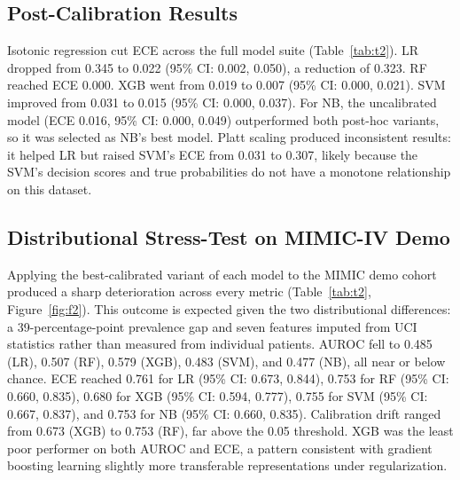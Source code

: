 \subsection{Post-Calibration Results}

Isotonic regression cut ECE across the full model suite (Table~\ref{tab:t2}). LR dropped from 0.345 to 0.022 (95\% CI: 0.002, 0.050), a reduction of 0.323. RF reached ECE 0.000. XGB went from 0.019 to 0.007 (95\% CI: 0.000, 0.021). SVM improved from 0.031 to 0.015 (95\% CI: 0.000, 0.037). For NB, the uncalibrated model (ECE 0.016, 95\% CI: 0.000, 0.049) outperformed both post-hoc variants, so it was selected as NB's best model. Platt scaling produced inconsistent results: it helped LR but raised SVM's ECE from 0.031 to 0.307, likely because the SVM's decision scores and true probabilities do not have a monotone relationship on this dataset.

\subsection{Distributional Stress-Test on MIMIC-IV Demo}

Applying the best-calibrated variant of each model to the MIMIC demo cohort produced a sharp deterioration across every metric (Table~\ref{tab:t2}, Figure~\ref{fig:f2}). This outcome is expected given the two distributional differences: a 39-percentage-point prevalence gap and seven features imputed from UCI statistics rather than measured from individual patients. AUROC fell to 0.485 (LR), 0.507 (RF), 0.579 (XGB), 0.483 (SVM), and 0.477 (NB), all near or below chance. ECE reached 0.761 for LR (95\% CI: 0.673, 0.844), 0.753 for RF (95\% CI: 0.660, 0.835), 0.680 for XGB (95\% CI: 0.594, 0.777), 0.755 for SVM (95\% CI: 0.667, 0.837), and 0.753 for NB (95\% CI: 0.660, 0.835). Calibration drift ranged from 0.673 (XGB) to 0.753 (RF), far above the 0.05 threshold. XGB was the least poor performer on both AUROC and ECE, a pattern consistent with gradient boosting learning slightly more transferable representations under regularization.

